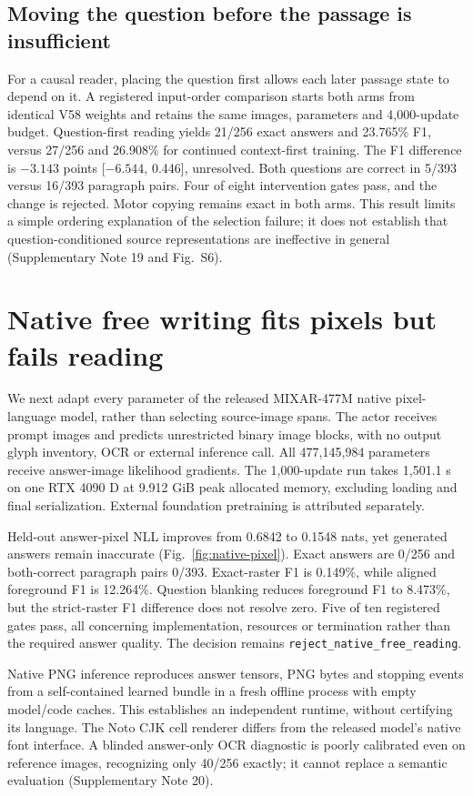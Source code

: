\subsection*{Moving the question before the passage is insufficient}
For a causal reader, placing the question first allows each later passage
state to depend on it. A registered input-order comparison starts both arms
from identical V58 weights and retains the same images, parameters and
4,000-update budget. Question-first reading yields 21/256 exact answers and
23.765\% F1, versus 27/256 and 26.908\% for continued context-first training.
The F1 difference is $-3.143$ points [$-6.544$, 0.446], unresolved. Both
questions are correct in 5/393 versus 16/393 paragraph pairs. Four of eight
intervention gates pass, and the change is rejected. Motor copying remains
exact in both arms. This result limits a simple ordering explanation of the
selection failure; it does not establish that question-conditioned source
representations are ineffective in general (Supplementary Note 19 and Fig.~S6).

\section*{Native free writing fits pixels but fails reading}
We next adapt every parameter of the released MIXAR-477M native
pixel-language model\cite{mixar}, rather than selecting source-image spans.
The actor receives prompt images and predicts unrestricted binary image
blocks, with no output glyph inventory, OCR or external inference call.
All 477,145,984 parameters receive answer-image likelihood gradients.
The 1,000-update run takes 1,501.1 s on one RTX 4090 D at 9.912 GiB peak
allocated memory, excluding loading and final serialization. External
foundation pretraining is attributed separately.

Held-out answer-pixel NLL improves from 0.6842 to 0.1548 nats, yet generated
answers remain inaccurate (Fig.~\ref{fig:native-pixel}). Exact answers are
0/256 and both-correct paragraph pairs 0/393. Exact-raster F1 is 0.149\%,
while aligned foreground F1 is 12.264\%. Question blanking reduces foreground
F1 to 8.473\%, but the strict-raster F1 difference does not resolve zero.
Five of ten registered gates pass, all concerning implementation, resources
or termination rather than the required answer quality. The decision remains
\texttt{reject\_native\_free\_reading}.

Native PNG inference reproduces answer tensors, PNG bytes and stopping events
from a self-contained learned bundle in a fresh offline process with empty
model/code caches. This establishes an independent runtime, without certifying
its language. The Noto CJK cell renderer differs from the released model's
native font interface. A blinded answer-only OCR diagnostic is poorly
calibrated even on reference images, recognizing only 40/256 exactly; it
cannot replace a semantic evaluation (Supplementary Note 20).


